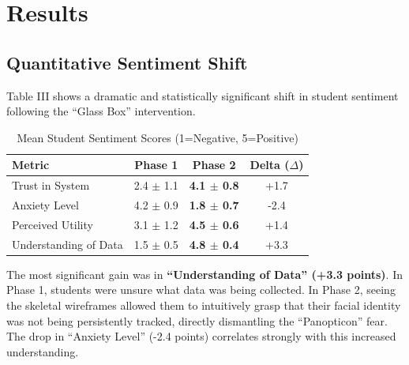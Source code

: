 \documentclass[conference]{IEEEtran}
\begin{document}
\section{Results}

\subsection{Quantitative Sentiment Shift}
Table III shows a dramatic and statistically significant shift in student sentiment following the ``Glass Box'' intervention.

\begin{table}[htbp]
\caption{Mean Student Sentiment Scores (1=Negative, 5=Positive)}
\begin{center}
\begin{tabular}{lccc}
\toprule
\textbf{Metric} & \textbf{Phase 1} & \textbf{Phase 2} & \textbf{Delta ($\Delta$)} \\
\midrule
Trust in System & 2.4 $\pm$ 1.1 & \textbf{4.1 $\pm$ 0.8} & +1.7 \\
Anxiety Level & 4.2 $\pm$ 0.9 & \textbf{1.8 $\pm$ 0.7} & -2.4 \\
Perceived Utility & 3.1 $\pm$ 1.2 & \textbf{4.5 $\pm$ 0.6} & +1.4 \\
Understanding of Data & 1.5 $\pm$ 0.5 & \textbf{4.8 $\pm$ 0.4} & +3.3 \\
\bottomrule
\end{tabular}
\end{center}
\label{tab:results}
\end{table}

The most significant gain was in \textbf{``Understanding of Data'' (+3.3 points)}. In Phase 1, students were unsure what data was being collected. In Phase 2, seeing the skeletal wireframes allowed them to intuitively grasp that their facial identity was not being persistently tracked, directly dismantling the ``Panopticon'' fear. The drop in ``Anxiety Level'' (-2.4 points) correlates strongly with this increased understanding.
\end{document}
